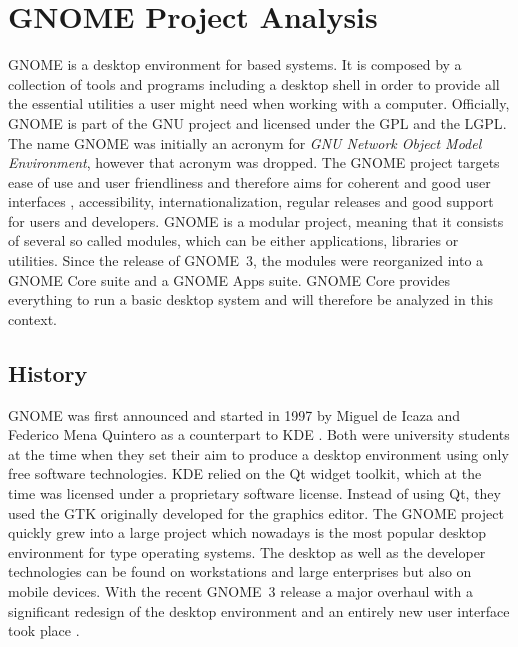 \section{GNOME Project Analysis} %


GNOME is a desktop environment for  based systems. It
is composed by a collection of tools and programs including a desktop shell in
order to provide all the essential utilities a user might need when working
with a computer. Officially, GNOME is part of the \ac{GNU} project and licensed
under the \ac{GPL} and the \ac{LGPL}. The name GNOME was initially an acronym
for \emph{GNU Network Object Model Environment}, however that acronym was
dropped. The GNOME project targets ease of use and user friendliness and
therefore aims for coherent and good user interfaces \cite{GNOMEHIG},
accessibility, internationalization, regular releases and good support for
users and developers. GNOME is a modular project, meaning that it consists of
several so called modules, which can be either applications, libraries or
utilities. Since the release of GNOME~3, the modules were reorganized into a
GNOME Core suite and a GNOME Apps suite. GNOME Core provides everything to run
a basic desktop system and will therefore be analyzed in this context.

\subsection{History} %

GNOME was first announced and started in 1997 by Miguel de Icaza and Federico
Mena Quintero as a counterpart to KDE
\cite{German2003,GNOMEAbout,GNOMEAnnouncement}. Both were university students
at the time when they set their aim to produce a desktop environment using only
free software technologies. KDE relied on the Qt widget toolkit, which at the
time was licensed under a proprietary software license. Instead of using Qt,
they used the \ac{GTK} originally developed for the  graphics
editor. The GNOME project quickly grew into a large project which nowadays is
the most popular desktop environment for  type operating
systems. The desktop as well as the developer technologies can be found on
workstations and large enterprises but also on mobile devices. With the recent
GNOME~3 release a major overhaul with a significant redesign of the desktop
environment and an entirely new user interface took place \cite{GNOMEPress}.


